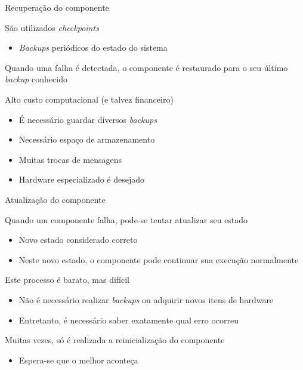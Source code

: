 \documentclass[compress]{beamer}
\begin{document}
\begin{frame}{Recuperação do componente}

São utilizados \textit{checkpoints}
\begin{itemize}
    \item \textit{Backups} periódicos do estado do sistema
\end{itemize}

\vspace{0.5cm}

Quando uma falha é detectada, o componente é restaurado para o seu último \textit{backup} conhecido

\vspace{0.5cm}

Alto custo computacional (e talvez financeiro)
\begin{itemize}
    \item É necessário guardar diversos \textit{backups}
    \item Necessário espaço de armazenamento
    \item Muitas trocas de mensagens
    \item Hardware especializado é desejado
\end{itemize}
\end{frame}


\begin{frame}{Atualização do componente}

Quando um componente falha, pode-se tentar atualizar seu estado
\begin{itemize}
    \item Novo estado considerado correto
    \item Neste novo estado, o componente pode continuar sua execução normalmente
\end{itemize}

\vspace{0.5cm}

Este processo é barato, mas difícil
\begin{itemize}
    \item Não é necessário realizar \textit{backups} ou adquirir novos itens de hardware
    \item Entretanto, é necessário saber exatamente qual erro ocorreu
\end{itemize}

\vspace{0.5cm}

Muitas vezes, só é realizada a reinicialização do componente
\begin{itemize}
    \item Espera-se que o melhor aconteça
\end{itemize}
\end{frame}
\end{document}
